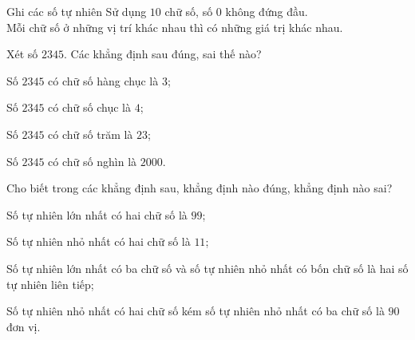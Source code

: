 \begin{dang}{Ghi các số tự nhiên}
Sử dụng $10$ chữ số, số $0$ không đứng đầu.\\
Mỗi chữ số ở những vị trí khác nhau thì có những giá trị khác nhau.
\end{dang}

\begin{vd}
Xét số $2345$. Các khẳng định sau đúng, sai thế nào?
\begin{enumEX}{2}
	\item Số $2345$ có chữ số hàng chục là $3$;
	\item Số $2345$ có chữ số chục là $4$;
	\item Số $2345$ có chữ số trăm là $23$;
	\item Số $2345$ có chữ số nghìn là $2000$.
\end{enumEX}
\end{vd}

\begin{vd}
Cho biết trong các khẳng định sau, khẳng định nào đúng, khẳng định nào sai?
\begin{enumEX}{1}
\item Số tự nhiên lớn nhất có hai chữ số là $99$;
\item Số tự nhiên nhỏ nhất có hai chữ số là $11$;
\item Số tự nhiên lớn nhất có ba chữ số và số tự nhiên nhỏ nhất có bốn chữ số là hai số tự nhiên liên tiếp;
\item Số tự nhiên nhỏ nhất có hai chữ số kém số tự nhiên nhỏ nhất có ba chữ số là $90$ đơn vị.	
\end{enumEX}
\end{vd}


